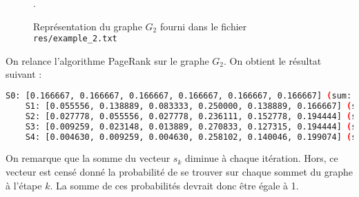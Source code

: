 \begin{figure}
    \centering
    \caption{Représentation du graphe $G_2$ fourni dans le fichier \texttt{res/example\_2.txt}}.
    \label{fig:graph_g2}
\end{figure}

On relance l'algorithme PageRank sur le graphe $G_2$. On obtient le résultat suivant :

\begin{minipage}{\dimexpr\linewidth-20pt}
    \begin{lstlisting}[language=bash, caption={Résultat de l'algorithme PageRank sur le graphe $G_2$ fourni, pour $k = 4$, avec la somme des valeurs du vecteur $s_k$ à chaque itération $k$.}]
    S0: [0.166667, 0.166667, 0.166667, 0.166667, 0.166667, 0.166667] (sum: 1.000000)
    S1: [0.055556, 0.138889, 0.083333, 0.250000, 0.138889, 0.166667] (sum: 0.833333)
    S2: [0.027778, 0.055556, 0.027778, 0.236111, 0.152778, 0.194444] (sum: 0.694444)
    S3: [0.009259, 0.023148, 0.013889, 0.270833, 0.127315, 0.194444] (sum: 0.638889)
    S4: [0.004630, 0.009259, 0.004630, 0.258102, 0.140046, 0.199074] (sum: 0.615741)
    \end{lstlisting}
\end{minipage}

On remarque que la somme du vecteur $s_k$ diminue à chaque itération. Hors, ce vecteur est censé donné la probabilité de se trouver sur chaque sommet du graphe à l'étape $k$. La somme de ces probabilités devrait donc être égale à 1.

